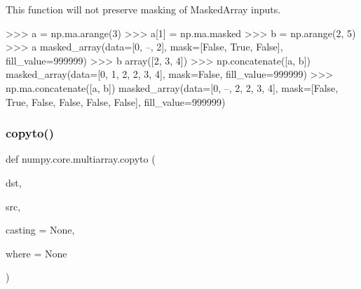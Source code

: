 \begin{DoxyVerb}
This function will not preserve masking of MaskedArray inputs.

>>> a = np.ma.arange(3)
>>> a[1] = np.ma.masked
>>> b = np.arange(2, 5)
>>> a
masked_array(data=[0, --, 2],
             mask=[False,  True, False],
       fill_value=999999)
>>> b
array([2, 3, 4])
>>> np.concatenate([a, b])
masked_array(data=[0, 1, 2, 2, 3, 4],
             mask=False,
       fill_value=999999)
>>> np.ma.concatenate([a, b])
masked_array(data=[0, --, 2, 2, 3, 4],
             mask=[False,  True, False, False, False, False],
       fill_value=999999)\end{DoxyVerb}
 \mbox{\label{namespacenumpy_1_1core_1_1multiarray_a878552fb00620ce0518647ec8148c123}} 
\subsubsection{\texorpdfstring{copyto()}{copyto()}}
{\footnotesize\ttfamily def numpy.\+core.\+multiarray.\+copyto (\begin{DoxyParamCaption}\item[{}]{dst,  }\item[{}]{src,  }\item[{}]{casting = {\ttfamily None},  }\item[{}]{where = {\ttfamily None} }\end{DoxyParamCaption})}

